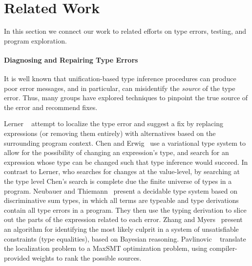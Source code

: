 \section{Related Work}
\label{sec:related-work}
In this section we connect our work to related efforts on type errors,
testing, and program exploration.


\paragraph{Diagnosing and Repairing Type Errors}
\label{sec:diagnosis-repair}
It is well known that unification-based type inference procedures can
produce poor error messages, and in particular, can misidentify the
\emph{source} of the type error.
%
Thus, many groups have explored techniques to pinpoint the true source
of the error and recommend fixes.

Lerner \etal~\cite{lerner_searching_2007} attempt to localize the type
error and suggest a fix by replacing expressions (or removing them
entirely) with alternatives based on the surrounding program context.
%
Chen and Erwig~\cite{chen_counter-factual_2014} use a variational type
system to allow for the possibility of changing an expression's type,
and search for an expression whose type can be changed such that type
inference would succeed.
%
%
In contrast to Lerner, who searches for changes at the
value-level, by searching at the type level Chen's search is complete due
the finite universe of types in a program.
%
Neubauer and Thiemann~\cite{neubauer_discriminative_2003} present a
decidable type system based on discriminative sum types, in which all
terms are typeable and type derivations contain all type errors in a
program. They then use the typing derivation to slice out the parts of
the expression related to each error.
%
Zhang and Myers~\cite{zhang_toward_2014} present an algorithm for
identifying the most likely culprit in a system of unsatisfiable
constraints (\eg type equalities), based on Bayesian reasoning.
%
Pavlinovic \etal~\cite{pavlinovic_finding_2014} translate the %
localization problem to a MaxSMT optimization problem, using
compiler-provided weights to rank the possible sources.

